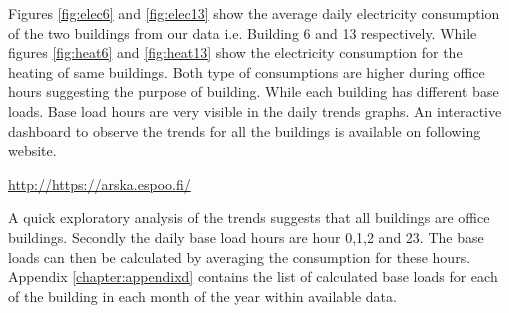 Figures \ref{fig:elec6} and \ref{fig:elec13} show the average daily electricity consumption of the two buildings from our data i.e. Building 6 and 13 respectively. While  figures \ref{fig:heat6} and \ref{fig:heat13} show the electricity consumption for the heating of same buildings. Both type of consumptions are higher during office hours suggesting the purpose of building.  While each building has different base loads. Base load hours are very visible in the daily trends graphs. An interactive dashboard to observe the trends for all the buildings is available on following website.

\url{http://https://arska.espoo.fi/}

A quick exploratory analysis of the trends suggests that all buildings are office buildings. Secondly the daily base load hours are hour 0,1,2 and 23. The base loads can then be calculated by averaging the consumption for these hours. Appendix \ref{chapter:appendixd} contains the list of calculated base loads for each of the building in each month of the year within available data.


